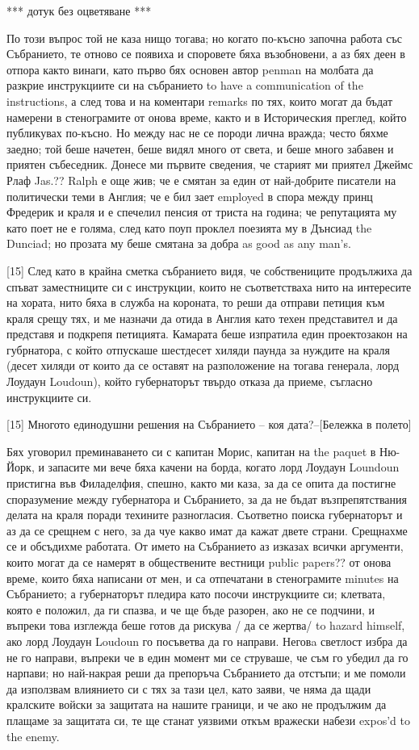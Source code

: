 \documentclass[12pt]{book}
\begin{document}
*** дотук без оцветяване *** 


По този въпрос той не каза нищо тогава; но когато по-късно започна работа със Събранието, те отново се появиха и споровете бяха възобновени, а аз бях деен в отпора както винаги, като първо бях основен автор penman на молбата да разкрие инструкциите си на събранието to have a communication of the instructions, а след това и на коментари remarks по тях, които могат да бъдат намерени в стенограмите от онова време, както и в Историческия преглед, който публикувах по-късно. Но между нас не се породи лична вражда; често бяхме заедно; той беше начетен, беше видял много от света, и беше много забавен и приятен събеседник. Донесе ми първите сведения, че старият ми приятел Джеймс Рлаф Jas.?? Ralph е още жив; че е смятан за един от най-добрите писатели на политически теми в Англия; че е бил зает employed в спора между принц Фредерик и краля и е спечелил пенсия от триста на година; че репутацията му като поет не е голяма, след като поуп проклел поезията му в Дънсиад the Dunciad; но прозата му беше смятана за добра as good as any man's. 

[15] След като в крайна сметка събранието видя, че собствениците продължиха да спъват заместниците си с инструкции, които не съответстваха нито на интересите на хората, нито бяха в служба на короната, то реши да отправи петиция към краля срещу тях, и ме назначи да отида в Англия като техен представител и да представя и подкрепя петицията. Камарата беше изпратила един проектозакон на губрнатора, с който отпускаше шестдесет хиляди паунда за нуждите на краля (десет хиляди от които да се оставят на разположение на тогава генерала, лорд Лоудаун Loudoun), който губернаторът твърдо отказа да приеме, съгласно инструкциите си. 

     [15] Многото единодушни решения на Събранието --
          коя дата?--[Бележка в полето]

Бях уговорил преминаването си с капитан Морис, капитан на the paquet в Ню-Йорк, и запасите ми вече бяха качени на борда, когато лорд Лоудаун Loundoun пристигна във Филаделфия, спешно, както ми каза, за да се опита да постигне споразумение между губернатора и Събранието, за да не бъдат възпрепятствания делата на краля поради техините разногласия. Съответно поиска губернаторът и аз да се срещнем с него, за да чуе какво имат да кажат двете страни. Срещнахме се и обсъдихме работата. От името на Събранието аз изказах всички аргументи, които могат да се намерят в обществените вестници public papers?? от онова време, които бяха написани от мен, и са отпечатани в стенограмите minutes на Събранието; а губернаторът пледира като посочи инструкциите си; клетвата, която е положил, да ги спазва, и че ще бъде разорен, ако не се подчини, и въпреки това изглежда беше готов да рискува / да се жертва/ to hazard himself, ако лорд Лоудаун Loudoun го посъветва да го направи. Неговa светлост избра да не го направи, въпреки че в един момент ми се струваше, че съм го убедил да го нарпави; но най-накрая реши да препоръча Събранието да отстъпи; и ме помоли да използвам влиянието си с тях за тази цел, като заяви, че няма да щади кралските войски за защитата на нашите граници, и че ако не продължим да плащаме за защитата си, те ще станат уязвими откъм вражески набези expos'd to the enemy.
\end{document}
